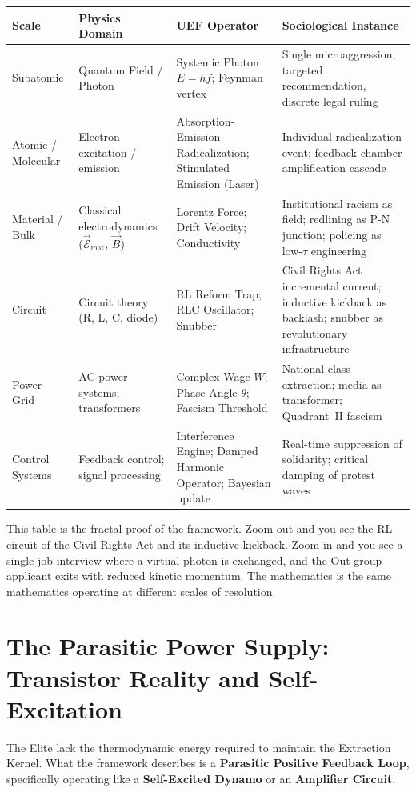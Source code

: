 \begin{center}
\begin{tabular}{llll}
\toprule
Scale & Physics Domain & UEF Operator & Sociological Instance \\
\midrule
Subatomic & Quantum Field / Photon & Systemic Photon $E = hf$; Feynman vertex & Single microaggression, targeted recommendation, discrete legal ruling \\
Atomic / Molecular & Electron excitation / emission & Absorption-Emission Radicalization; Stimulated Emission (Laser) & Individual radicalization event; feedback-chamber amplification cascade \\
Material / Bulk & Classical electrodynamics ($\vec{\mathcal{E}}_{\text{mat}}$, $\vec{B}$) & Lorentz Force; Drift Velocity; Conductivity & Institutional racism as field; redlining as P-N junction; policing as low-$\tau$ engineering \\
Circuit & Circuit theory (R, L, C, diode) & RL Reform Trap; RLC Oscillator; Snubber & Civil Rights Act incremental current; inductive kickback as backlash; snubber as revolutionary infrastructure \\
Power Grid & AC power systems; transformers & Complex Wage $W$; Phase Angle $\theta$; Fascism Threshold & National class extraction; media as transformer; Quadrant~II fascism \\
Control Systems & Feedback control; signal processing & Interference Engine; Damped Harmonic Operator; Bayesian update & Real-time suppression of solidarity; critical damping of protest waves \\
\bottomrule
\end{tabular}
\end{center}

This table is the fractal proof of the framework. Zoom out and you see the RL circuit of the Civil Rights Act and its inductive kickback. Zoom in and you see a single job interview where a virtual photon is exchanged, and the Out-group applicant exits with reduced kinetic momentum. The mathematics is the same mathematics operating at different scales of resolution.

\section{The Parasitic Power Supply: Transistor Reality and Self-Excitation}
\label{sec:parasitic_power}

The Elite lack the thermodynamic energy required to maintain the Extraction Kernel. What the framework describes is a \textbf{Parasitic Positive Feedback Loop}, specifically operating like a \textbf{Self-Excited Dynamo} or an \textbf{Amplifier Circuit}.

